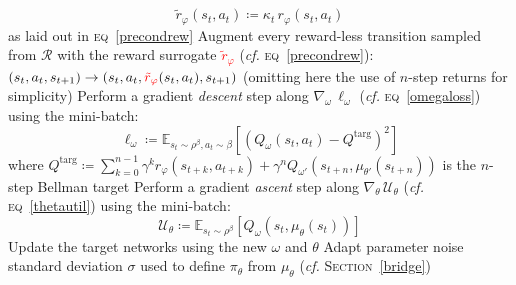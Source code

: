 \begin{algorithm}
{{{{            $$\tilde{r}_\varphi (s_t,a_t) \coloneqq \kappa_t \, r_\varphi (s_t,a_t)$$
            as laid out in \textsc{eq}~\ref{precondrew}\;}
            Augment every reward-less transition sampled from $\mathcal{R}$
                with the reward surrogate \textcolor{red}{$\tilde{r}_\varphi$}
                (\textit{cf.} \textsc{eq}~\ref{precondrew}):
                $(s_t, a_t, s_{t+1}) \to (s_t, a_t, \textcolor{red}{\tilde{r}_\varphi} (s_t,a_t), s_{t+1})$
                (omitting here the use of $n$-step returns for simplicity)\;
            \SetNlSty{}{\textcolor{red}{$\diamond$}}{}
            Perform a gradient \emph{descent} step along
                $\nabla_\omega \, \ell_\omega$
                (\textit{cf.} \textsc{eq}~\ref{omegaloss})
                using the mini-batch:
                $$
                \ell_\omega \coloneqq \mathbb{E}_{s_t \sim \rho^\beta, a_t \sim \beta}[
                (Q_\omega(s_t, a_t)
                - Q^\text{targ})^2]
                $$
                where
                $Q^\text{targ} \coloneqq \sum_{k=0}^{n-1} \gamma^{k} r_\varphi(s_{t+k}, a_{t+k})
                + \gamma^n Q_{\omega'} (s_{t+n}, \mu_{\theta'}(s_{t+n}))$ is the $n$-step Bellman target\;
            Perform a gradient \emph{ascent} step along
                $\nabla_\theta \, \mathcal{U}_\theta$
                (\textit{cf.} \textsc{eq}~\ref{thetautil})
                using the mini-batch:
                $$
                \mathcal{U}_\theta \coloneqq
                \mathbb{E}_{s_t \sim \rho^\beta}
                [Q_\omega(s_t, \mu_\theta(s_t))]
                $$
                \;
            \SetNlSty{}{}{}
            Update the target networks using the new $\omega$ and $\theta$\;
        }
    }
    Adapt parameter noise standard deviation $\sigma$
    used to define $\pi_\theta$ from $\mu_\theta$ (\textit{cf.} \textsc{Section}~\ref{bridge})\;
}
\caption{%
\small
SAM augmented with our provably more robust extension
\emph{Pessimistic Reward Preconditioning Enforcing Lipschitzness},
dubbed \textbf{``PURPLE''} (with minor vowel filling and letter shuffle for legibility). \\
\textcolor{red}{Text in red color}: differing from SAM (\textit{cf.}~\textsc{Algorithm}~\ref{algosam})}
\label{algopurple}
\end{algorithm}
\DecMargin{1em}


